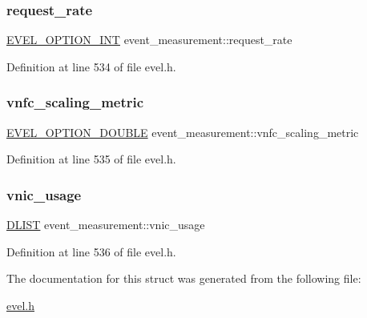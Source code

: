 \subsubsection{\texorpdfstring{request\+\_\+rate}{request\_rate}}
{\footnotesize\ttfamily \hyperlink{evel_8h_a452d825778d1c2368a54b8f689a25ba7}{E\+V\+E\+L\+\_\+\+O\+P\+T\+I\+O\+N\+\_\+\+I\+NT} event\+\_\+measurement\+::request\+\_\+rate}



Definition at line 534 of file evel.\+h.

\hypertarget{structevent__measurement_a85193cc6ed303d8e386d1d7a405bc0af}{}\label{structevent__measurement_a85193cc6ed303d8e386d1d7a405bc0af} 
\subsubsection{\texorpdfstring{vnfc\+\_\+scaling\+\_\+metric}{vnfc\_scaling\_metric}}
{\footnotesize\ttfamily \hyperlink{evel_8h_aafc42b3cd9aca88804c3d413e4ccec06}{E\+V\+E\+L\+\_\+\+O\+P\+T\+I\+O\+N\+\_\+\+D\+O\+U\+B\+LE} event\+\_\+measurement\+::vnfc\+\_\+scaling\+\_\+metric}



Definition at line 535 of file evel.\+h.

\hypertarget{structevent__measurement_a2fcf32022554986d2e7e31cf561abbc4}{}\label{structevent__measurement_a2fcf32022554986d2e7e31cf561abbc4} 
\subsubsection{\texorpdfstring{vnic\+\_\+usage}{vnic\_usage}}
{\footnotesize\ttfamily \hyperlink{double__list_8h_a45f4a129042d9e1aa4ffd31fe13e4d14}{D\+L\+I\+ST} event\+\_\+measurement\+::vnic\+\_\+usage}



Definition at line 536 of file evel.\+h.



The documentation for this struct was generated from the following file\+:\begin{DoxyCompactItemize}
\item 
\hyperlink{evel_8h}{evel.\+h}\end{DoxyCompactItemize}
